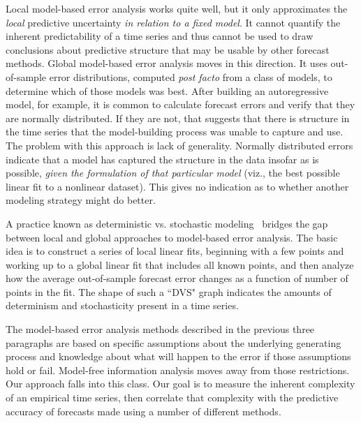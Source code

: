 Local model-based error analysis works quite well, but it only
approximates the \emph{local} predictive uncertainty \emph{in relation
  to a fixed model}.  It cannot quantify the inherent predictability
of a time series and thus cannot be used to draw conclusions about
predictive structure that may be usable by other forecast methods.
%
%
Global model-based error analysis moves in this direction.  It uses
out-of-sample error distributions, computed \emph{post facto} from a
class of models, to determine which of those models was best.  After
building an autoregressive model, for example, it is common to
calculate forecast errors and verify that they are normally distributed.
If they are not, that suggests that there is structure in the time
series that the model-building process was unable to capture and use.
The problem with this approach is lack of generality.  
\label{page:normal-errors}
Normally distributed errors indicate that a model has captured the
structure in the data insofar as is possible, \emph{given the
  formulation of that particular model} (viz., the best possible
linear fit to a nonlinear dataset).  This gives no indication as to
whether another modeling strategy might do better.


A practice known as deterministic vs. stochastic
modeling~\cite{weigend93, Casdagli92dvsplots} bridges the gap
between local and global approaches to model-based error analysis.
The basic idea is to construct a series of local linear fits,
beginning with a few points and working up to a global linear fit that
includes all known points, and then analyze how the average
out-of-sample forecast error changes as a function of number of points
in the fit. The shape of such a ``DVS" graph indicates the amounts of
determinism and stochasticity present in a time series.

The model-based error analysis methods described in the previous three
paragraphs are based on specific assumptions about the underlying
generating process and knowledge about what will happen to the error
if those assumptions hold or fail.  Model-free information analysis
moves away from those restrictions.  Our approach falls into this
class.  Our goal is to measure the inherent complexity of an empirical
time series, then correlate that complexity with the predictive
accuracy of forecasts made using a number of different methods.

